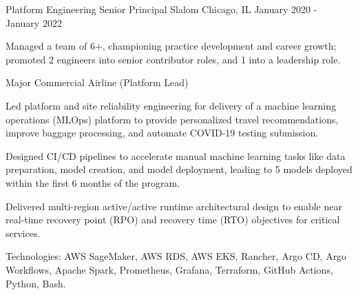 \begin{cventries}
  \cventry
    {Platform Engineering Senior Principal} %
    {Slalom} %
    {Chicago, IL} %
    {January 2020 - January 2022} %
    {
      \begin{cvitems} %
        \item {Managed a team of 6+, championing practice development and career growth; promoted 2 engineers into senior contributor roles, and 1 into a leadership role.}
      \end{cvitems}
    }

  \cventry
    {Major Commercial Airline (Platform Lead)} %
    {} %
    {} %
    {} %
    {
      \begin{cvitems} %
        \item {Led platform and site reliability engineering for delivery of a machine learning operations (MLOps) platform to provide personalized travel recommendations, improve baggage processing, and automate COVID-19 testing submission.}
        \item {Designed CI/CD pipelines to accelerate manual machine learning tasks like data preparation, model creation, and model deployment, leading to 5 models deployed within the first 6 months of the program.}
        \item {Delivered multi-region active/active runtime architectural design to enable near real-time recovery point (RPO) and recovery time (RTO) objectives for critical services.}
        \item {Technologies: AWS SageMaker, AWS RDS, AWS EKS, Rancher, Argo CD, Argo Workflows, Apache Spark, Prometheus, Grafana, Terraform, GitHub Actions, Python, Bash.}
      \end{cvitems}
    }


\end{cventries}
